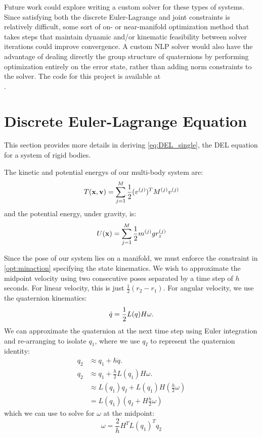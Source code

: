 \documentclass[conference]{IEEEtran}
\begin{document}
Future work could explore writing a custom solver for these types of systems. Since 
satisfying both the discrete Euler-Lagrange and joint constraints is relatively difficult,
some sort of on- or near-manifold optimization method that takes steps that maintain 
dynamic and/or kinematic feasibility between solver iterations could improve convergence. 
A custom NLP solver would also have the advantage of dealing directly the group structure of
quaternions by performing optimization entirely on the error state, rather than adding 
norm constraints to the solver. The code for this project is available at \\
.


\printbibliography

\appendix
\section{Discrete Euler-Lagrange Equation}
This section provides more details in deriving \eqref{eq:DEL_single}, the 
DEL equation for a system of rigid bodies.

The kinetic and potential energys of our multi-body system are:
\begin{equation}
    T(\mathbf{x},\mathbf{v}) = \sum_{j=1}^M \frac{1}{2} (v^{(j)})^T M^{(j)} v^{(j)}
\end{equation}
and the potential energy, under gravity, is:
\begin{equation}
    U(\mathbf{x}) = \sum_{j=1}^M \frac{1}{2} m^{(j)} g r_z^{(j)}
\end{equation}


Since the pose of our system lies on a manifold, we must enforce the constraint in 
\eqref{opt:minaction} specifying the state kinematics. We wish to approximate the midpoint 
velocity using two consecutive poses separated by a time step of $h$ seconds. For linear 
velocity, this is just $\frac{1}{2} (r_2 - r_1)$. For angular velocity, we use the quaternion
kinematics:
\begin{equation}
    \dot{q} = \frac{1}{2} L(q) H \omega.
\end{equation}
We can approximate the quaternion at the next time step using Euler integration and 
re-arranging to isolate $q_1$, where we use $q_I$ to represent the quaternion identity:
\begin{subequations}
    \begin{align}
        q_{2} &\approx q_1 + h \dot{q}. \\
        q_{2} &\approx q_1 + \frac{h}{2} L(q_1) H \omega. \\
        &\approx L(q_1) q_I + L(q_1) H \left(\frac{h}{2} \omega\right) \\
        &= L(q_1) \left(q_I + H \frac{h}{2} \omega\right)
    \end{align}
\end{subequations}
which we can use to solve for $\omega$ at the midpoint:
\begin{equation}
    \omega = \frac{2}{h} H^T L(q_1)^T q_2
\end{equation}
\end{document}

